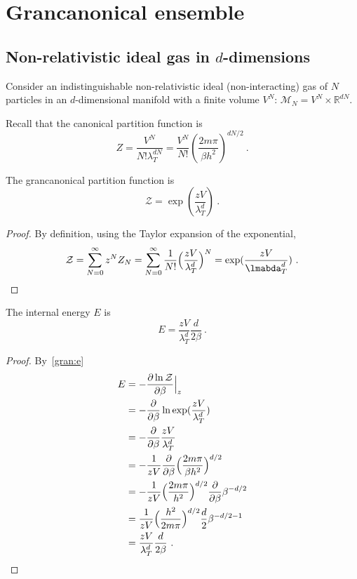 \chapter{Grancanonical ensemble}

\section{Non-relativistic ideal gas in $d$-dimensions}

    Consider an indistinguishable non-relativistic ideal (non-interacting) gas of $N$ particles in an $d$-dimensional manifold with a finite volume $V^N$: $\mathcal M_N = V^N \times \mathbb R^{dN}$. 

    Recall that the canonical partition function is
    \begin{equation*}
        Z = \frac{V^N}{N! \lambda^{dN}_T} = \frac{V^N}{N!} (\frac{2 m \pi}{\beta h^2})^{dN/2} ~.
    \end{equation*}

    The grancanonical partition function is 
    \begin{equation*}
        \mathcal Z = \exp(\frac{z V}{\lambda_T^d}) ~.
     \end{equation*}
    \begin{proof}
        By definition, using the Taylor expansion of the exponential,
        \begin{equation*}
            \mathcal Z = \sum_{N=0}^\infty z^N Z_N = \sum_{N=0}^\infty \frac{1}{N!} \Big ( \frac{z V}{\lambda_T^d} \Big)^N = \exp(\frac{z V}{\lmabda_T^d}) ~.
        \end{equation*}
    \end{proof}
    
    The internal energy $E$ is 
    \begin{equation*}
        E = \frac{z V}{\lambda^d_T} \frac{d}{2 \beta} ~.
    \end{equation*}
    \begin{proof}
        By~\eqref{gran:e}
        \begin{equation*}
        \begin{aligned}
            E & = - \frac{\partial\ln \mathcal Z}{\partial\beta} \Big \vert_z \\ & = - \frac{\partial}{\partial\beta} \ln \exp(\frac{z V}{\lambda_T^d}) \\ & = - \frac{\partial}{\partial\beta} \frac{z V}{\lambda^d_T} \\ & = - \frac{1}{zV} \frac{\partial}{\partial\beta} \Big ( \frac{2 m \pi} {\beta h^2} \Big )^{d/2} \\ & = - \frac{1}{z V} \Big ( \frac{2 m \pi}{h^2} \Big )^{d/2} \frac{\partial}{\partial\beta} \beta^{-d/2} \\ & = \frac{1}{zV} \Big ( \frac{h^2}{2 m \pi} \Big )^{d/2} \frac{d}{2} \beta^{-d/2 - 1} \\ & = \frac{z V}{\lambda^d_T} \frac{d}{2 \beta} ~.
        \end{aligned}
        \end{equation*}
    \end{proof}
    

